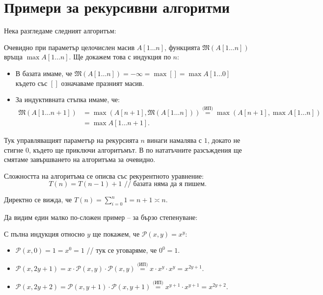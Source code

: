 \section{Примери за рекурсивни алгоритми}

Нека разгледаме следният алгоритъм:


Очевидно при параметър целочислен масив $A[1 \dots n]$, функцията $\mathfrak{M}(A[1 \dots n])$ връща $\max A[1 \dots n]$.
Ще докажем това с индукция по $n$:
\begin{itemize}
    \item В базата имаме, че $\mathfrak{M}(A[1 \dots n]) = -\infty = \max [] = \max A[1 \dots 0]$ където със $[]$ означаваме празният масив.
    \item За индуктивната стъпка имаме, че:
          \begin{align*}
              \mathfrak{M}(A[1 \dots n + 1]) & = \max(A[n + 1], \mathfrak{M}(A[1 \dots n])) \stackrel{\text{(ИП)}}{=} \max(A[n + 1], \max A[1 \dots n]) \\
                                             & = \max A[1 \dots n + 1].
          \end{align*}
\end{itemize}

Тук управляващият параметър на рекурсията $n$ винаги намалява с $1$, докато не стигне $0$, където ще приключи алгоритъмът.
В по нататъчните разсъждения ще смятаме завършването на алгоритъма за очевидно.

Сложността на алгоритъма се описва със рекурентното уравнение:
\[
    T(n) = T(n - 1) + 1 \text{ // базата няма да я пишем}.
\]

Директно се вижда, че $T(n) = \sum\limits_{i = 0}^n 1 = n + 1 \asymp n$.

Да видим един малко по-сложен пример -- за бързо степенуване:


С пълна индукция относно $y$ ще покажем, че $\mathcal{P}(x, y) = x^y$:
\begin{itemize}
    \item $\mathcal{P}(x, 0) = 1 = x^0 = 1$ // тук се уговаряме, че $0^0 = 1$.
    \item $\mathcal{P}(x, 2y + 1) = x \cdot \mathcal{P}(x, y) \cdot \mathcal{P}(x, y) \stackrel{\text{(ИП)}}{=} x \cdot x^y \cdot x^y = x^{2y + 1}$.
    \item $\mathcal{P}(x, 2y + 2) = \mathcal{P}(x, y + 1) \cdot \mathcal{P}(x, y + 1) \stackrel{\text{(ИП)}}{=} x^{y + 1} \cdot x^{y + 1} = x^{2y + 2}$.
\end{itemize}

